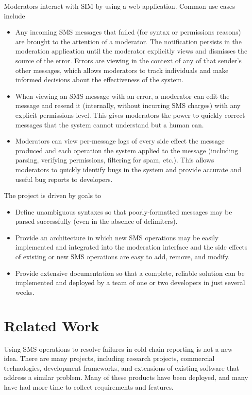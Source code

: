 \documentclass{acm_proc_article-sp}
\begin{document}
Moderators interact with SIM by using a web application. Common use cases include

\begin{itemize}
\item Any incoming SMS messages that failed (for syntax or permissions reasons) are brought to the attention of a moderator. The notification persists in the moderation application until the moderator explicitly views and dismisses the source of the error. Errors are viewing in the context of any of that sender's other messages, which allows moderators to track individuals and make informed decisions about the effectiveness of the system.
\item When viewing an SMS message with an error, a moderator can edit the message and resend it (internally, without incurring SMS charges) with any explicit permissions level. This gives moderators the power to quickly correct messages that the system cannot understand but a human can.
\item Moderators can view per-message logs of every side effect the message produced and each operation the system applied to the message (including parsing, verifying permissions, filtering for spam, etc.). This allows moderators to quickly identify bugs in the system and provide accurate and useful bug reports to developers.
\end{itemize}

The project is driven by goals to 

\begin{itemize}
\item Define unambiguous syntaxes so that poorly-formatted messages may be parsed successfully (even in the absence of delimiters).
\item Provide an architecture in which new SMS operations may be easily implemented and integrated into the moderation interface and the side effects of existing or new SMS operations are easy to add, remove, and modify.
\item Provide extensive documentation so that a complete, reliable solution can be implemented and deployed by a team of one or two developers in just several weeks.
\end{itemize}

\section{Related Work}

Using SMS operations to resolve failures in cold chain reporting is not a new idea. There are many projects, including research projects, commercial technologies, development frameworks, and extensions of existing software that address a similar problem. Many of these products have been deployed, and many have had more time to collect requirements and features.
\end{document}
